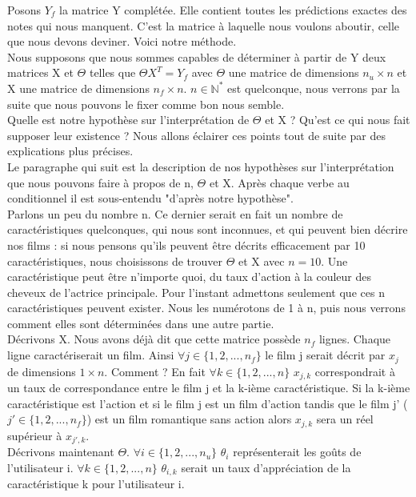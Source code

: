 \documentclass[a4paper,10pt]{article}
\begin{document}
Posons $Y_f$ la matrice Y complétée. Elle contient toutes les prédictions exactes des notes qui nous manquent. C'est la matrice à laquelle nous voulons aboutir, celle que nous devons deviner. Voici notre méthode.\\

Nous supposons que nous sommes capables de déterminer à partir de Y deux matrices X et $\Theta$ telles que $\Theta X^T = Y_f$ avec $\Theta$ une matrice de dimensions $n_u \times n$ et X une matrice de dimensions $n_f \times n$. $n \in \mathbb{N}^*$ est quelconque, nous verrons par la suite que nous pouvons le fixer comme bon nous semble.\\ 
Quelle est notre hypothèse sur l'interprétation de $\Theta$ et X ? Qu'est ce qui nous fait supposer leur existence ? Nous allons éclairer ces points tout de suite par des explications plus précises.\\

Le paragraphe qui suit est la description de nos hypothèses sur l'interprétation que nous pouvons faire à propos de n, $\Theta$ et X. Après chaque verbe au conditionnel il est sous-entendu "d'après notre hypothèse".\\
Parlons un peu du nombre n. Ce dernier serait en fait un nombre de caractéristiques quelconques, qui nous sont inconnues, et qui peuvent bien décrire nos films : si nous pensons qu'ils peuvent être décrits efficacement par 10 caractéristiques, nous choisissons de trouver $\Theta$ et X avec $n = 10$. 
Une caractéristique peut être n'importe quoi, du taux d'action à la couleur des cheveux de l'actrice principale. Pour l'instant admettons seulement que ces n caractéristiques peuvent exister. Nous les numérotons de 1 à n, puis nous verrons comment elles sont déterminées dans une autre partie.\\
Décrivons X. Nous avons déjà dit que cette matrice possède $n_f$ lignes. Chaque ligne caractériserait un film. Ainsi $\forall j \in \{1, 2, ..., n_f\}$ le film j serait décrit par $x_j$ de dimensions $1 \times n$. Comment ? En fait $\forall k \in \{1, 2, ..., n\}$ $x_{j,k}$ correspondrait à un taux de correspondance entre le film j et la k-ième caractéristique. Si la k-ième caractéristique est l'action et si le film j est un film d'action tandis que le film j' ($j' \in \{1, 2, ..., n_f\}$) est un film romantique sans action alors $x_{j,k}$ sera un réel supérieur à $x_{j',k}$.\\
Décrivons maintenant $\Theta$. $\forall i \in \{1, 2, ..., n_u\}$ $\theta_{i}$ représenterait les goûts de l'utilisateur i. $\forall k \in \{1, 2, ..., n\}$ $\theta_{i,k}$ serait un taux d'appréciation de la caractéristique k pour l'utilisateur i.\\
\end{document}
